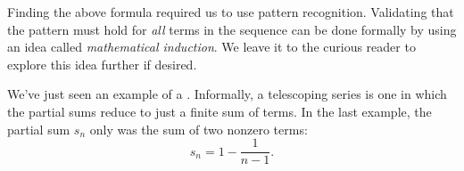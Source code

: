 \documentclass{ximera}
\begin{document}
\begin{remark}
Finding the above formula required us to use pattern recognition.  Validating that the pattern must hold for \emph{all} terms in the sequence can be done formally by using an idea called \emph{mathematical induction}.  We leave it to the curious reader to explore this idea further if desired.
\end{remark}

We've just seen an example of a . Informally,
a telescoping series is one in which the partial sums reduce to just a
finite sum of terms. In the last example, the partial sum $s_n$ only was the sum of two nonzero terms: 
\[
s_n = 1 - \frac{1}{n-1}.
\]

%
\end{document}

